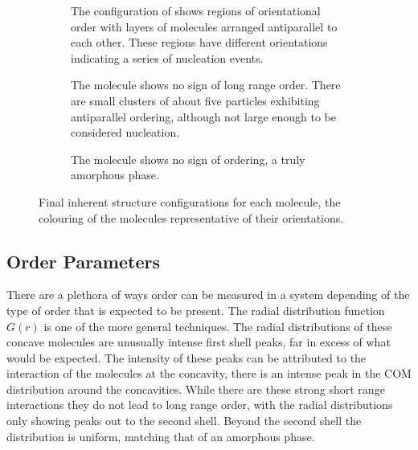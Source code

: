 \begin{figure}
    \centering
    \begin{subfigure}{0.45\linewidth}
        \caption{The configuration of \sone shows regions of orientational order with layers of molecules arranged antiparallel to each other. These regions have different orientations indicating a series of nucleation events.}
        \label{fig:sone inherent}
    \end{subfigure}
    \begin{subfigure}{0.45\linewidth}%
        \caption{The \scon molecule shows no sign of long range order. There are small clusters of about five particles exhibiting antiparallel ordering, although not large enough to be considered nucleation.}
        \label{fig:scon inherent}
    \end{subfigure}
    \begin{subfigure}{0.45\linewidth}
        \caption{The \tri molecule shows no sign of ordering, a truly amorphous phase.}
        \label{fig:tri inherent}
    \end{subfigure}
    \caption{Final inherent structure configurations for each molecule, the colouring of the molecules representative of their orientations.}
    \label{fig:inherent structures frame}
\end{figure}

\subsection{Order Parameters}

There are a plethora of ways order can be measured in a system depending of the type of order that is expected to be present. The radial distribution function $G(r)$ is one of the more general techniques. The radial distributions  of these concave molecules are unusually intense first shell peaks, far in excess of what would be expected. The intensity of these peaks can be attributed to the interaction of the molecules at the concavity, there is an intense peak in the COM distribution around the concavities. While there are these strong short range interactions they do not lead to long range order, with the radial distributions only showing peaks out to the second shell. Beyond the second shell the distribution is uniform, matching that of an amorphous phase.

